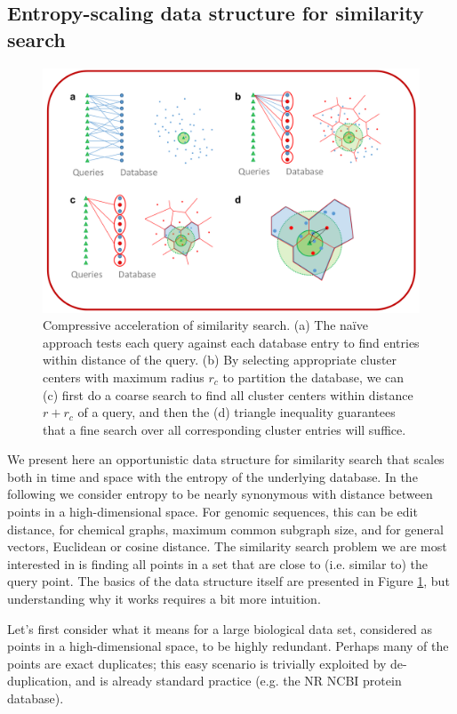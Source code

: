 \documentclass[review,preprint,12pt]{elsarticle}
\theoremstyle{definition}
\theoremstyle{remark}
\numberwithin{equation}{section}
\begin{document}
\subsection{Entropy-scaling data structure for similarity search}
\begin{figure}[btp]
    \centering
    \includegraphics[width=1\textwidth]{assets/dataStructure}
    \caption{ Compressive acceleration of similarity search. %
            (a) The na\"ive approach tests each query against each database entry to find entries within distance  of the query. %
            (b) By selecting appropriate cluster centers with maximum radius $r_c$ to partition the database, we can (c) first do a coarse search to find all cluster centers within distance $r+r_c$ of a query, and then the (d) triangle inequality guarantees that a fine search over all corresponding cluster entries will suffice.}
    \label{fig:dataStructure}
\end{figure}

We present here an opportunistic data structure for similarity search that scales both in time and space with the entropy of the underlying database.
In the following we consider entropy to be nearly synonymous with distance between points in a high-dimensional space.
For genomic sequences, this can be edit distance, for chemical graphs, maximum common subgraph size, and for general vectors, Euclidean or cosine distance.
The similarity search problem we are most interested in is finding all points in a set that are close to (i.e. similar to) the query point.
The basics of the data structure itself are presented in Figure \ref{fig:dataStructure}, but understanding why it works requires a bit more intuition.

Let's first consider what it means for a large biological data set, considered as points in a high-dimensional space, to be highly redundant.
Perhaps many of the points are exact duplicates; this easy scenario is trivially exploited by de-duplication, and is already standard practice (e.g. the NR NCBI protein database).
\end{document}
